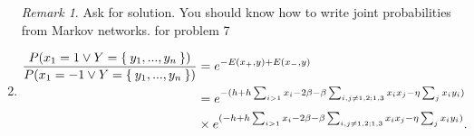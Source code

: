 \documentclass[12pt,oneside,reqno]{amsart}
\theoremstyle{plain}
\theoremstyle{definition}
\theoremstyle{remark}
\newtheorem{rem}[theorem]{Remark}
\newcommand{\bee}{\begin{equation}\begin{aligned}}
\newcommand{\eee}{\end{aligned}\end{equation}}
\newcommand{\fracc}{\frac}
\begin{document}
\begin{enumerate}[label=\arabic*.]
\setcounter{enumi}{6}

\begin{rem}
Ask for solution. You should know how to write joint probabilities from Markov networks. for problem 7
\end{rem}

\item 
\bee
\fracc{P(x_1 = 1 \vee Y = \Set{y_1,...,y_n})}{P(x_1 = -1 \vee Y = \Set{y_1,...,y_n})} &= e^{-E(x_+,y) + E(x_-,y)}\\
&= e^{-(h + h\sum_{i > 1} x_i - 2 \beta - \beta \sum_{i,j \neq 1,2;1,3} x_i x_j - \eta \sum_j x_iy_i)}\\
&\times e^{( -h + h\sum_{i > 1} x_i - 2 \beta - \beta \sum_{i,j \neq 1,2;1,3} x_i x_j - \eta \sum_j x_iy_i)}. \\
\eee

\end{enumerate}
\end{document}
